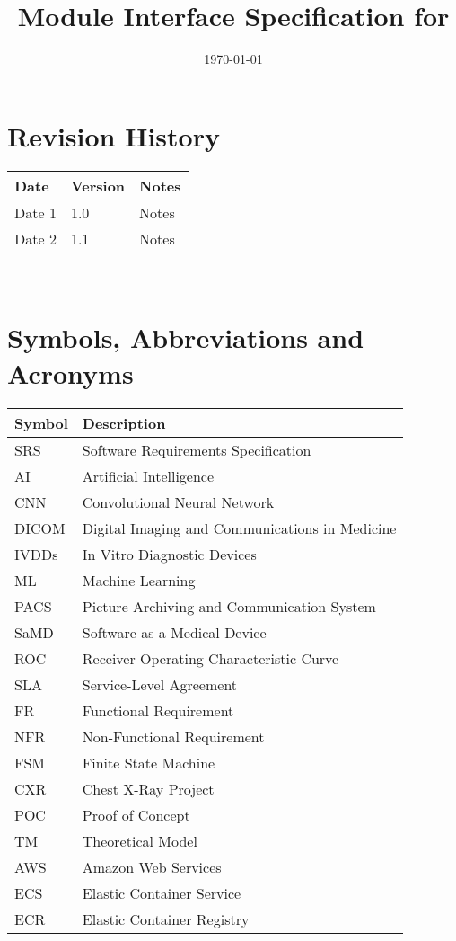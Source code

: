 \documentclass[12pt, titlepage]{article}
\begin{document}
\title{Module Interface Specification for \progname{}}

\author{\authname}

\date{\today}

\maketitle


\section{Revision History}

\begin{tabularx}{\textwidth}{p{3cm}p{2cm}X}
\toprule {\bf Date} & {\bf Version} & {\bf Notes}\\
\midrule
Date 1 & 1.0 & Notes\\
Date 2 & 1.1 & Notes\\
\bottomrule
\end{tabularx}

~\newpage

\section{Symbols, Abbreviations and Acronyms}

\renewcommand{\arraystretch}{1.3}
\noindent \begin{tabular}{l l} 
  \toprule		
  \textbf{Symbol} & \textbf{Description}\\
  \midrule 
  SRS & Software Requirements Specification\\
  AI & Artificial Intelligence\\
  CNN & Convolutional Neural Network\\
  DICOM & Digital Imaging and Communications in Medicine\\
  IVDDs & In Vitro Diagnostic Devices\\
  ML & Machine Learning\\
  PACS & Picture Archiving and Communication System\\
  SaMD & Software as a Medical Device\\
  ROC & Receiver Operating Characteristic Curve\\
  SLA & Service-Level Agreement\\
  FR & Functional Requirement\\
  NFR & Non-Functional Requirement\\
  FSM & Finite State Machine\\
  CXR & Chest X-Ray Project\\
  POC & Proof of Concept\\
  TM & Theoretical Model\\
  AWS & Amazon Web Services\\
  ECS & Elastic Container Service\\
  ECR & Elastic Container Registry\\
  \bottomrule
\end{tabular}
\end{document}

